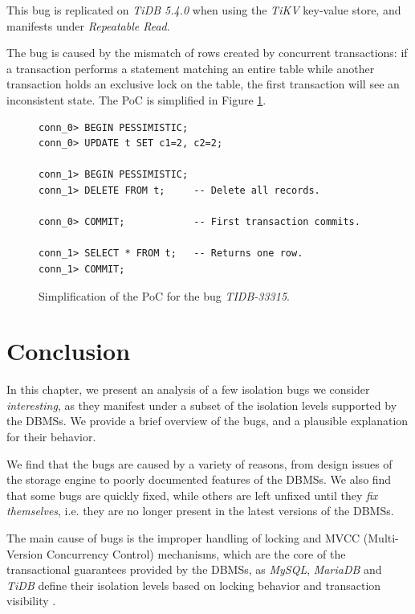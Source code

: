 This bug is replicated on \textit{TiDB 5.4.0} when using the \textit{TiKV} key-value store, and manifests under \textit{Repeatable Read}. 

The bug is caused by the mismatch of rows created by concurrent transactions: if a transaction performs a statement matching an entire table while another transaction holds an exclusive lock on the table, the first transaction will see an inconsistent state. The PoC is simplified in Figure \ref{fig:TIDB-33315}.

\begin{figure}
\begin{verbatim}
conn_0> BEGIN PESSIMISTIC;
conn_0> UPDATE t SET c1=2, c2=2;

conn_1> BEGIN PESSIMISTIC;
conn_1> DELETE FROM t;     -- Delete all records.

conn_0> COMMIT;            -- First transaction commits.

conn_1> SELECT * FROM t;   -- Returns one row.
conn_1> COMMIT;
\end{verbatim}
\caption{Simplification of the PoC for the bug \textit{TIDB-33315}.} \label{fig:TIDB-33315}
\end{figure}


\section{Conclusion}

In this chapter, we present an analysis of a few isolation bugs we consider \textit{interesting}, as they manifest under a subset of the isolation levels supported by the DBMSs. We provide a brief overview of the bugs, and a plausible explanation for their behavior.

We find that the bugs are caused by a variety of reasons, from design issues of the storage engine to poorly documented features of the DBMSs. We also find that some bugs are quickly fixed, while others are left unfixed until they \textit{fix themselves}, i.e. they are no longer present in the latest versions of the DBMSs.

The main cause of bugs is the improper handling of locking and MVCC (Multi-Version Concurrency Control) mechanisms, which are the core of the transactional guarantees provided by the DBMSs, as \textit{MySQL}, \textit{MariaDB} and \textit{TiDB} define their isolation levels based on locking behavior and transaction visibility \cite{mysqlisolationlevels,mariadbtransactions,tidbisolationlevels}.
